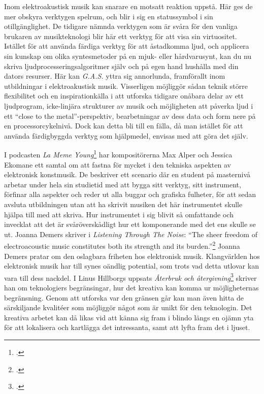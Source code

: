 \documentclass{article}
\begin{document}
Inom elektroakustisk musik kan snarare en motsatt reaktion uppstå. Här ges de mer obskyra verktygen spelrum,
och blir i sig en statussymbol i sin otillgänglighet. De tidigare nämnda verktygen som är svåra för den
vanliga brukaren av musikteknologi blir här ett verktyg för att visa sin virtuositet. Istället för att använda
färdiga verktyg för att åstadkomma ljud, och applicera sin kunskap om olika syntesmetoder på en mjuk- eller
hårdvarusynt, kan du nu skriva ljudprocesseringsalgoritmer själv och på egen hand hushålla med din dators
resurser. Här kan \emph{G.A.S.} yttra sig annorlunda, framförallt inom utbildningar i elektroakustisk
musik. Visserligen möjliggör sådan teknik större flexibilitet och en inspirationkälla i att utforska tidigare
onåbara delar av ett ljudprogram, icke-linjära strukturer av musik och möjligheten att påverka ljud i ett
``close to the metal''-perspektiv, bearbetningar av dess data och form nere på en processorcykelnivå. Dock kan
detta bli till en fälla, då man istället för att använda färdigbyggda verktyg som hjälpmedel, envisas med att
göra det själv.

I podcasten \emph{La Meme Young}\footcite{LaMemeYoung} har kompositörerna Max Alper och Jessica Ekomane ett
samtal om att fastna för mycket i den tekniska aspekten av elektronisk konstmusik. De beskriver ett scenario
där en student på masternivå arbetar under hela sin studietid med att bygga sitt verktyg, sitt instrument,
förfinar alla aspekter och reder ut alla buggar och grafiska fulheter, för att sedan avsluta utbildningen utan
att ha skrivit musiken det här instrumentet skulle hjälpa till med att skriva. Hur instrumentet i sig blivit
så omfattande och invecklat att det är svåröverskådligt hur ett komponerande med det ens skulle se ut. Joanna
Demers skriver i \emph{Listening Through The Noise}: ``The sheer freedom of electroacoustic music constitutes
both its strength and its burden.''\footcite{JoannaDemers} Joanna Demers pratar om den oslagbara friheten hos
elektronisk musik. Klangvärlden hos elektronisk musik har till synes oändlig potential, som trots vad detta
utlovar kan vara till dess nackdel. I Linus Hillborgs uppsats \emph{Återbruk och
återgivning}\footcite{LinusHillborg} skriver han om teknologiers begränsingar, hur det kreativa kan komma ur
möjligheternas begränsning. Genom att utforska var den gränsen går kan man även hitta de särskiljande
kvalitéer som möjliggör något som är unikt för den teknologin. Det kreativa arbetet kan då likas vid att känna
sig fram i blindo längs en ojämn yta för att lokalisera och kartlägga det intressanta, samt att lyfta fram det
i ljuset.
\end{document}
